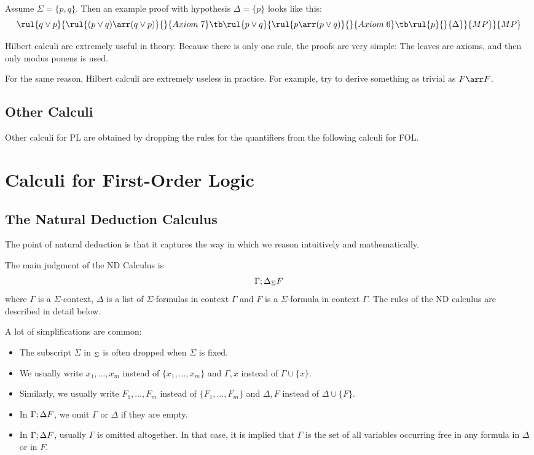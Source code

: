 Assume $\Sigma=\{p,q\}$. Then an example proof with hypothesis $\Delta=\{p\}$ looks like this:
\[\rul{q\vee p}{\rul{(p\vee q)\arr(q\vee p)}{}{Axiom\;7} \tb \rul{p \vee q}{\rul{p\arr (p\vee q)}{}{Axiom\;6} \tb \rul{p}{}{\Delta}}{MP}}{MP}\]

Hilbert calculi are extremely useful in theory. Because there is only one rule, the proofs are very simple: The leaves are axioms, and then only modus ponens is used.

For the same reason, Hilbert calculi are extremely useless in practice. For example, try to derive something as trivial as $F\arr F$.

\subsection{Other Calculi}

Other calculi for PL are obtained by dropping the rules for the quantifiers from the following calculi for FOL.


\section{Calculi for First-Order Logic}

\subsection{The Natural Deduction Calculus}

The point of natural deduction is that it captures the way in which we reason intuitively and mathematically.

The main judgment of the ND Calculus is  \[\Gamma; \Delta_\Sigma F\]
where $\Gamma$ is a $\Sigma$-context, $\Delta$ is a list of $\Sigma$-formulas in context $\Gamma$ and $F$ is a $\Sigma$-formula in context $\Gamma$.
The rules of the ND calculus are described in detail below.

\begin{notation}
A lot of simplifications are common:
\begin{itemize}
\item The subscript $\Sigma$ in $_\Sigma$ is often dropped when $\Sigma$ is fixed.
\item We usually write $x_1,\ldots,x_m$ instead of $\{x_1,\ldots,x_m\}$ and $\Gamma,x$ instead of $\Gamma\cup\{x\}$.
\item Similarly, we usually write $F_1,\ldots,F_m$ instead of $\{F_1,\ldots,F_m\}$ and $\Delta,F$ instead of $\Delta\cup\{F\}$.
\item In $\Gamma;\Delta F$, we omit $\Gamma$ or $\Delta$ if they are empty.
\item In $\Gamma;\Delta F$, usually $\Gamma$ is omitted altogether. In that case, it is implied that $\Gamma$ is the set of all variables occurring free in any formula in $\Delta$ or in $F$.
\end{itemize}
\end{notation}

